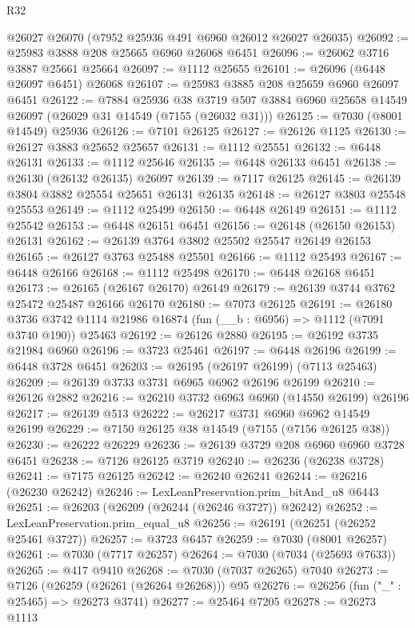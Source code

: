 \begin{lexlean}{R32}
\begin{coremodule}
    @26027
    @26070
    (@7952 @25936 @491 @6960 @26012 @26027 @26035)
@26092 := @25983 @3888 @208 @25665 @6960 @26068 @6451
@26096 := @26062 @3716 @3887 @25661 @25664
@26097 := @1112 @25655
@26101 := @26096 (@6448 @26097 @6451) @26068
@26107 := @25983 @3885 @208 @25659 @6960 @26097 @6451
@26122 := @7884
    @25936
    @38
    @3719
    @507
    @3884
    @6960
    @25658
    @14549
    @26097
    (@26029 @31 @14549 (@7155 (@26032 @31)))
@26125 := @7030 (@8001 @14549) @25936
@26126 := @7101 @26125
@26127 := @26126 @1125
@26130 := @26127 @3883 @25652 @25657
@26131 := @1112 @25551
@26132 := @6448 @26131
@26133 := @1112 @25646
@26135 := @6448 @26133 @6451
@26138 := @26130 (@26132 @26135) @26097
@26139 := @7117 @26125
@26145 := @26139 @3804 @3882 @25554 @25651 @26131 @26135
@26148 := @26127 @3803 @25548 @25553
@26149 := @1112 @25499
@26150 := @6448 @26149
@26151 := @1112 @25542
@26153 := @6448 @26151 @6451
@26156 := @26148 (@26150 @26153) @26131
@26162 := @26139 @3764 @3802 @25502 @25547 @26149 @26153
@26165 := @26127 @3763 @25488 @25501
@26166 := @1112 @25493
@26167 := @6448 @26166
@26168 := @1112 @25498
@26170 := @6448 @26168 @6451
@26173 := @26165 (@26167 @26170) @26149
@26179 := @26139 @3744 @3762 @25472 @25487 @26166 @26170
@26180 := @7073 @26125
@26191 := @26180
    @3736
    @3742
    @1114
    @21986
    @16874
    (fun (__b : @6956) => @1112 (@7091 @3740 @190))
    @25463
@26192 := @26126 @2880
@26195 := @26192 @3735 @21984 @6960
@26196 := @3723 @25461
@26197 := @6448 @26196
@26199 := @6448 @3728 @6451
@26203 := @26195 (@26197 @26199) (@7113 @25463)
@26209 := @26139 @3733 @3731 @6965 @6962 @26196 @26199
@26210 := @26126 @2882
@26216 := @26210 @3732 @6963 @6960 (@14550 @26199) @26196
@26217 := @26139 @513
@26222 := @26217 @3731 @6960 @6962 @14549 @26199
@26229 := @7150 @26125 @38 @14549 (@7155 (@7156 @26125 @38))
@26230 := @26222 @26229
@26236 := @26139 @3729 @208 @6960 @6960 @3728 @6451
@26238 := @7126 @26125 @3719
@26240 := @26236 (@26238 @3728)
@26241 := @7175 @26125
@26242 := @26240 @26241
@26244 := @26216 (@26230 @26242)
@26246 := LexLeanPreservation.prim_bitAnd_u8 @6443
@26251 := @26203 (@26209 (@26244 (@26246 @3727)) @26242)
@26252 := LexLeanPreservation.prim_equal_u8
@26256 := @26191 (@26251 (@26252 @25461 @3727))
@26257 := @3723 @6457
@26259 := @7030 (@8001 @26257)
@26261 := @7030 (@7717 @26257)
@26264 := @7030 (@7034 (@25693 @7633))
@26265 := @417 @9410
@26268 := @7030 (@7037 @26265) @7040
@26273 := @7126 (@26259 (@26261 (@26264 @26268))) @95
@26276 := @26256 (fun ("_" : @25465) => @26273 @3741)
@26277 := @25464 @7205
@26278 := @26273 @1113

\end{coremodule}
\end{lexlean}

